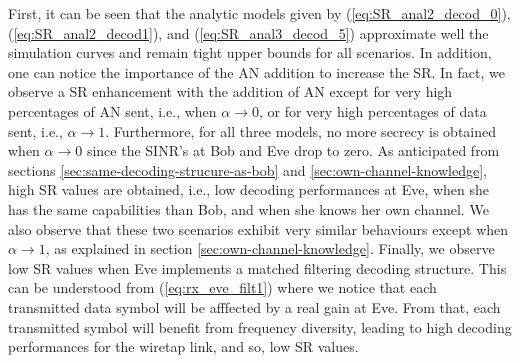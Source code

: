 \documentclass[journal,comsoc]{IEEEtran}
\begin{document}
First, it can be seen that the analytic models given by (\ref{eq:SR_anal2_decod_0}), (\ref{eq:SR_anal2_decod1}), and (\ref{eq:SR_anal3_decod_5}) approximate well the simulation curves and remain tight upper bounds for all scenarios.  In addition, one can notice the importance of the AN addition to increase the SR. In fact, we observe a SR enhancement with the addition of AN except for very high percentages of AN sent, i.e., when $\alpha \to 0$, or for very high percentages of data sent, i.e., $\alpha \to 1$. Furthermore, for all three models, no more secrecy is obtained when $\alpha \to 0$ since the SINR's at Bob and Eve drop to zero. As anticipated from sections \ref{sec:same-decoding-strucure-as-bob} and \ref{sec:own-channel-knowledge}, high SR values are obtained, i.e., low decoding performances at Eve, when she has the same capabilities than Bob, and when she knows her own channel. We also observe that these two scenarios exhibit very similar behaviours except when $\alpha \to 1$, as explained in section \ref{sec:own-channel-knowledge}. Finally, we observe low SR values when Eve implements a matched filtering decoding structure. This can be understood from (\ref{eq:rx_eve_filt1}) where we notice that each transmitted data symbol will be afffected by a real gain at Eve. From that, each transmitted symbol will benefit from frequency diversity, leading to high decoding performances for the wiretap link, and so, low SR values.   




\end{document}
